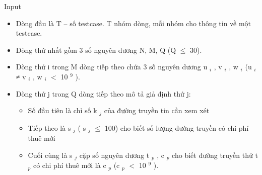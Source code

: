 Input
\begin{itemize}
	\item Dòng đầu là T – số testcase. T nhóm dòng, mỗi nhóm cho thông tin về một testcase.
	\item Dòng thứ nhất gồm 3 số nguyên dương N, M, Q (Q  $\le$  30).
	\item Dòng thứ i trong M dòng tiếp theo chứa 3 số nguyên dương u $_ i $ , v $_ i $ , w $_ i $ (u $_ i $ ≠ v $_ i $ , w $_ i $ $<$ 10 $^ 9 $ ).
	\item Dòng thứ j trong Q dòng tiếp theo mô tả giả định thứ j:
\begin{itemize}
	\item Số đầu tiên là chỉ số k $_ j $ của đường truyền tin cần xem xét
	\item Tiếp theo là s $_ j $ ( s $_ j $  $\le$  100) cho biết số lượng đường truyền có chi phí thuê mới
	\item Cuối cùng là s $_ j $ cặp số nguyên dương t $_ p $ , c $_ p $ cho biết đường truyền thứ t $_ p $ có chi phí thuê mới là c $_ p $ (c $_ p $ $<$ 10 $^ 9 $ ).
\end{itemize}
\end{itemize}